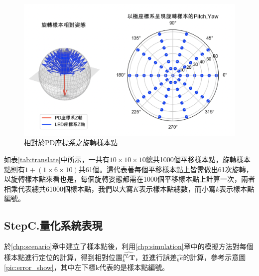 \begin{figure}[htpb]
    \centering
    \includegraphics[width=15cm]{ch4pic/rotate_sample.png}
    \caption{相對於PD座標系之旋轉樣本點}
    \label{pic:rotate_sample}
\end{figure}


如表\ref{tab:translate}中所示，一共有$10\times 10\times 10$總共1000個平移樣本點，旋轉樣本點則有$1+(1\times 6\times 10)$共61個。這代表著每個平移樣本點上皆需做出61次旋轉，以旋轉樣本點來看也是，每個旋轉姿態都需在1000個平移樣本點上計算一次，兩者相乘代表總共61000個樣本點，我們以大寫$K$表示樣本點總數，而小寫$k$表示樣本點編號。






\subsection{StepC.量化系統表現}
\label{chp:evaluate_method}

於\ref{chp:scenario}章中建立了樣本點後，利用\ref{chp:simulation}章中的模擬方法對每個樣本點進行定位的計算，得到相對位置$\hat{_k^{PL}\boldsymbol{T}}$，並進行誤差$\hat{_k e}$的計算，參考示意圖\ref{pic:error_show}，其中左下標k代表的是樣本點編號。

